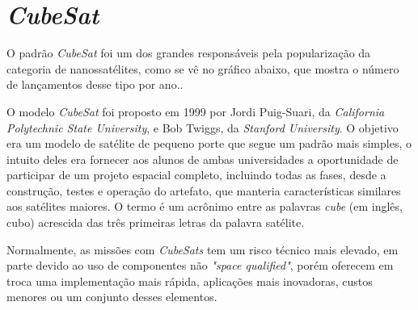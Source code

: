 \section{\textit{CubeSat}}\label{cubesat_revision}

O padrão \textit{CubeSat} foi um dos grandes responsáveis pela popularização da categoria de nanossatélites, como se vê no gráfico abaixo, que mostra o número de lançamentos desse tipo por ano.\cite{cubesats_cgee}.

\noindent
\begin{minipage}{\linewidth}
\label{cubesat_launches_fig}
\end{minipage}

O modelo \textit{CubeSat} foi proposto em 1999 por Jordi Puig-Suari, da \textit{California Polytechnic State University}, e Bob Twiggs, da \textit{Stanford University}. O objetivo era um modelo de satélite de pequeno porte que segue um padrão mais simples, o intuito deles era fornecer aos alunos de ambas universidades a oportunidade de  participar de um projeto espacial completo, incluindo todas as fases, desde a construção, testes e operação do artefato, que manteria características similares aos satélites maiores. O termo é um acrônimo entre as palavras \textit{cube} (em inglês, cubo) acrescida das três primeiras letras da palavra satélite.

Normalmente, as missões com \textit{CubeSats} tem um risco técnico mais elevado, em parte devido ao uso de componentes não \textit{"space qualified"}, porém oferecem em troca uma implementação mais rápida, aplicações mais inovadoras, custos menores ou um conjunto desses elementos.

